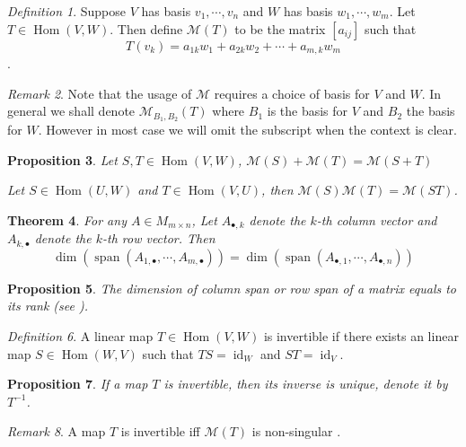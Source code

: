 \documentclass[12pt]{amsart}
\DeclareMathOperator{\s}{span}
\DeclareMathOperator{\Hom}{Hom}
\newcommand{\calM}[0]{\mathcal{M}}
\DeclareMathOperator{\id}{id}
\newtheorem{theorem}{Theorem}[section]
\newtheorem{proposition}[theorem]{Proposition}
\theoremstyle{remark}
\newtheorem{remark}[theorem]{Remark}
\newtheorem{definition}[theorem]{Definition}
\numberwithin{equation}{section}
\begin{document}
	\begin{definition}
	Suppose $V$ has basis $v_1,\cdots,v_n$ and $W$ has basis $w_1,\cdots,w_m$.
		Let $T\in\Hom(V,W)$. Then define $\calM(T)$ to be the matrix $[a_{ij}]$
		such that $$T(v_k)=a_{1k}w_1+a_{2k}w_2+\cdots+a_{m,k}w_m$$.%
	\end{definition}
	\begin{remark}
		Note that the usage of $\calM$ requires a choice of basis for $V$ and $W$. In general we shall denote $\calM_{B_1,B_2}(T)$ where $B_1$ is the basis for $V$ and $B_2$ the basis for $W$. However in most case we will omit the subscript when the context is clear.
	\end{remark}
	\begin{proposition}
		Let $S,T\in\Hom(V,W)$, 
		\(\calM(S)+\calM(T)=\calM(S+T)\)
		
		Let $S\in\Hom(U,W)$ and $T\in\Hom(V,U)$, then $\calM(S)\calM(T)=\calM(ST)$.
	\end{proposition}
	\begin{theorem}\label{thm:col-row-dim}
		For any $A\in M_{m\times n}$, Let $A_{\bullet,k}$ denote the $k$-th column vector and $A_{k,\bullet}$ denote the $k$-th row vector. Then
		\[\dim(\s(A_{1,\bullet},\cdots,A_{m,\bullet}))=\dim(\s(A_{\bullet,1},\cdots,A_{\bullet,n})) \]
	\end{theorem}

	\begin{proposition}
		The dimension of column span or row span of a matrix equals to its rank (see ).
	\end{proposition}
	\begin{definition}
		A linear map $T\in \Hom(V,W)$ is invertible if there exists an linear map $S\in\Hom(W,V)$ such that $TS=\id_W$ and $ST=\id_V$.
	\end{definition}
	\begin{proposition}
		If a map $T$ is invertible, then its inverse is unique, denote it by $T^{-1}$.
	\end{proposition}
	\begin{remark}
		A map $T$ is invertible iff $\calM(T)$ is non-singular .
	\end{remark}
	
\end{document}
